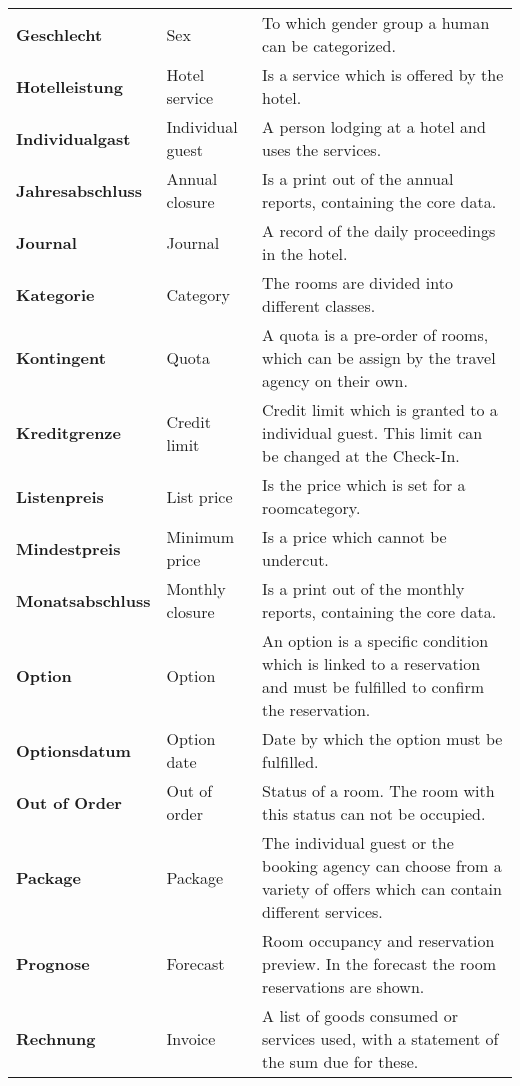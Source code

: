 \documentclass[../Pflichtenheft.tex]{subfiles}
\begin{document}
\begin{longtable}{p{4cm} p{4cm} p{6cm}}
        \textbf{Geschlecht} & {Sex} & To which gender group a human can be categorized. \\[0.5cm]
		\textbf{Hotelleistung} & {Hotel service} & Is a service which is offered by the hotel. \\[0.5cm]
        \textbf{Individualgast} & {Individual guest} & A person lodging at a hotel and uses the services. \\[0.5cm]
		\textbf{Jahresabschluss} & {Annual closure} & Is a print out of the annual reports, containing the core data. \\[0.5cm]
		\textbf{Journal} & {Journal} & A record of the daily proceedings in the hotel. \\[0.5cm]
        \textbf{Kategorie} & {Category} & The rooms are divided into different classes. \\[0.5cm]
        \textbf{Kontingent} & {Quota} & A quota is a pre-order of rooms, which can be assign by the travel agency on their own. \\[0.5cm]
        \textbf{Kreditgrenze} & {Credit limit} & Credit limit which is granted to a individual guest. This limit can be changed at the Check-In. \\[0.5cm]
		\textbf{Listenpreis} & {List price} & Is the price which is set for a roomcategory. \\[0.5cm]
		\textbf{Mindestpreis} & {Minimum price} & Is a price which cannot be undercut. \\[0.5cm]
        \textbf{Monatsabschluss} & {Monthly closure} & Is a print out of the monthly reports, containing the core data. \\[0.5cm]
        \textbf{Option} & {Option} & An option is a specific condition which is linked to a reservation and must be fulfilled to confirm the reservation. \\[0.5cm]
        \textbf{Optionsdatum} & {Option date} & Date by which the option must be fulfilled. \\[0.5cm]
        \textbf{Out of Order} & {Out of order} & Status of a room. The room with this status can not be occupied. \\[0.5cm]
        \textbf{Package} & {Package} & The individual guest or the booking agency can choose from a variety of offers which can contain different services. \\[0.5cm]
        \textbf{Prognose} & {Forecast} & Room occupancy and reservation preview. In the forecast the room reservations are shown. \\[0.5cm]
        \textbf{Rechnung} & {Invoice} & A list of goods consumed or services used, with a statement of the sum due for these. \\[0.5cm]

\end{longtable}
\end{document}
